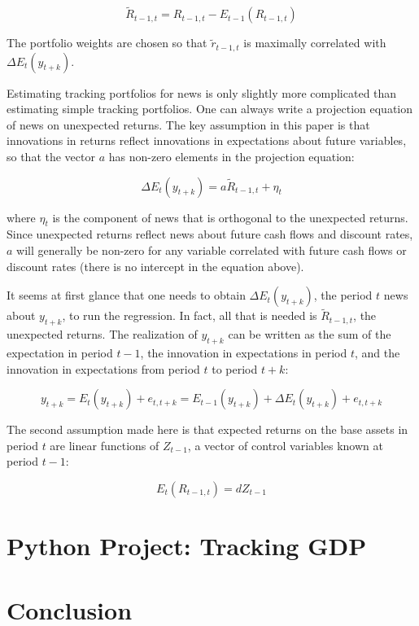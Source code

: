 \begin{equation}
    \tilde{R}_{t-1,t} = R_{t-1,t} - E_{t-1}(R_{t-1,t})
\end{equation}

The portfolio weights are chosen so that $\tilde{r}_{t-1,t}$
is maximally correlated with $\Delta E_t(y_{t+k})$.

Estimating tracking portfolios for news is only slightly 
more complicated than estimating simple tracking portfolios. 
One can always write a projection equation of news on 
unexpected returns. The key assumption in this paper 
is that innovations in returns reflect innovations in 
expectations about future variables, so that the vector $a$
has non-zero elements in the projection equation:

\begin{equation}
    \Delta E_t(y_{t+k}) = a\tilde{R}_{t-1,t} + \eta_t
\end{equation}

where $\eta_t$ is the component of news that is orthogonal
to the unexpected returns. Since unexpected returns reflect
news about future cash flows and discount rates, $a$
will generally be non-zero for any variable correlated 
with future cash flows or discount rates (there is no 
intercept in the equation above).

It seems at first glance that one needs to obtain $\Delta E_t(y_{t+k})$,
the period $t$ news about $y_{t+k}$, to run the regression.
In fact, all that is needed is $\tilde{R}_{t-1,t}$, the
unexpected returns. The realization of $y_{t+k}$ 
can be written as the sum of the expectation in period $t-1$,
the innovation in expectations in period $t$, and the
innovation in expectations from period $t$ to period $t+k$:

\begin{equation}
    y_{t+k} = E_{t}(y_{t+k}) + e_{t,t+k} = E_{t-1}(y_{t+k}) + \Delta E_t(y_{t+k}) + e_{t,t+k}
\end{equation}

The second assumption made here is that expected returns 
on the base assets in period $t$ are linear functions 
of $Z_{t-1}$, a vector of control variables known at 
period $t-1$:

\begin{equation}
    E_t(R_{t-1,t}) = d Z_{t-1}
\end{equation}

\section{Python Project: Tracking GDP}

\section{Conclusion}